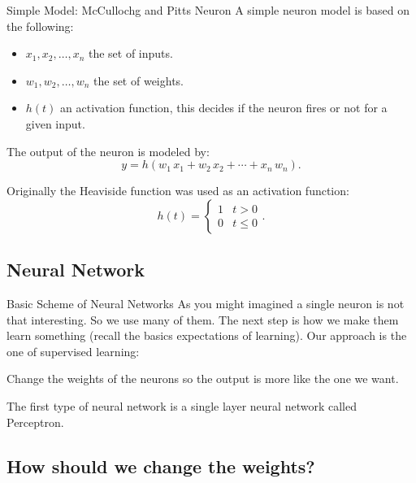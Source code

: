 \documentclass[presentation]{beamer}
\begin{document}
\begin{frame}[label={sec:org5217caa}]{Simple Model: McCullochg and Pitts Neuron}
A simple neuron model is based on the following:

\begin{itemize}
\item \(x_1, x_2, \dots, x_n\) the set of inputs.
\item \(w_1, w_2, \dots, w_n\) the set of weights.
\item \(h(t)\) an activation function, this decides if the neuron fires or not for a given input.
\end{itemize}

The output of the neuron is modeled by:
\[
  y = h(w_1 \, x_1 +w_2 \, x_2 + \cdots + x_n \, w_n).
\]

Originally the Heaviside function was used as an activation function: 
\[
  h(t) = \begin{cases}
    1 & t > 0 \\
    0 & t \leq 0
  \end{cases}.
\]
\end{frame}

\subsection{Neural Network}
\label{sec:orgf03526b}

\begin{frame}[label={sec:orgd45e90a}]{Basic Scheme of Neural Networks}
As you might imagined a single neuron is not that interesting. So we use many of them. The next step is how we make them learn something (recall the basics expectations of learning). Our approach is the one of supervised learning:

\alert{Change the weights of the neurons so the output is more like the one we want.}

The first type of neural network is a single layer neural network called  \alert{Perceptron}.
\end{frame}

\subsection{How should we change the weights?}
\label{sec:orgc81a22a}
\end{document}
